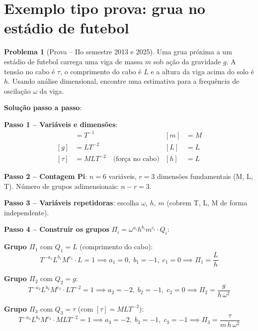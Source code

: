 \documentclass[12pt,a4paper,oneside]{book}
\theoremstyle{definition}
\newtheorem{problem}{Problema}
\begin{document}
\section{Exemplo tipo prova: grua no estádio de futebol}

\begin{problem}[Prova -- IIo semestre 2013 e 2025]
Uma grua próxima a um estádio de futebol carrega uma viga de massa $m$ sob ação da
gravidade $g$. A tensão no cabo é $\tau$, o comprimento do cabo é $L$ e a altura da viga
acima do solo é $h$. Usando análise dimensional, encontre uma estimativa para a
frequência de oscilação $\omega$ da viga.
\end{problem}

\textbf{Solução passo a passo}:

\textbf{Passo 1 -- Variáveis e dimensões}:
\begin{align}
    [\omega] &= T^{-1} &
    [m] &= M \\
    [g] &= LT^{-2} &
    [L] &= L \\
    [\tau] &= MLT^{-2} \quad \text{(força no cabo)} &
    [h] &= L
\end{align}

\textbf{Passo 2 -- Contagem Pi}: $n = 6$ variáveis, $r = 3$ dimensões fundamentais (M, L, T).
Número de grupos adimensionais: $n - r = 3$.

\textbf{Passo 3 -- Variáveis repetidoras}: escolha $\omega$, $h$, $m$
(cobrem T, L, M de forma independente).

\textbf{Passo 4 -- Construir os grupos} $\Pi_i = \omega^{a_i} h^{b_i} m^{c_i} \cdot Q_i$:

\medskip
\textbf{Grupo $\Pi_1$} com $Q_1 = L$ (comprimento do cabo):
\begin{equation}
T^{-a_1} L^{b_1} M^{c_1} \cdot L = 1
\implies a_1=0,\; b_1=-1,\; c_1=0
\implies \boxed{\Pi_1 = \frac{L}{h}}
\end{equation}

\textbf{Grupo $\Pi_2$} com $Q_2 = g$:
\begin{equation}
T^{-a_2} L^{b_2} M^{c_2} \cdot LT^{-2} = 1
\implies a_2=-2,\; b_2=-1,\; c_2=0
\implies \boxed{\Pi_2 = \frac{g}{h\,\omega^2}}
\end{equation}

\textbf{Grupo $\Pi_3$} com $Q_3 = \tau$ (com $[\tau]=MLT^{-2}$):
\begin{equation}
T^{-a_3} L^{b_3} M^{c_3} \cdot MLT^{-2} = 1
\implies a_3=-2,\; b_3=-1,\; c_3=-1
\implies \boxed{\Pi_3 = \frac{\tau}{m\,h\,\omega^2}}
\end{equation}
\end{document}
